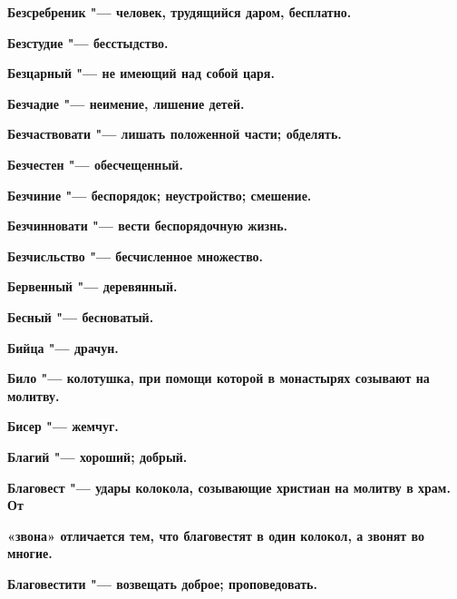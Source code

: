\begin{mymulticols}{2}
\bfseries Безсребреник\normalfont{} "--- человек, трудящийся даром, бесплатно. 




\bfseries Безстудие\normalfont{} "--- бесстыдство. 




\bfseries Безцарный\normalfont{} "--- не имеющий над собой царя. 




\bfseries Безчадие\normalfont{} "--- неимение, лишение детей. 




\bfseries Безчаствовати\normalfont{} "--- лишать положенной части; обделять. 




\bfseries Безчестен\normalfont{} "--- обесчещенный. 




\bfseries Безчиние\normalfont{} "--- беспорядок; неустройство; смешение. 




\bfseries Безчинновати\normalfont{} "--- вести беспорядочную жизнь. 




\bfseries Безчисльство\normalfont{} "--- бесчисленное множество. 




\bfseries Бервенный\normalfont{} "--- деревянный. 




\bfseries Бесный\normalfont{} "--- бесноватый. 




\bfseries Бийца\normalfont{} "--- драчун. 




\bfseries Било\normalfont{} "--- колотушка, при помощи которой в монастырях созывают на молитву. 




\bfseries Бисер\normalfont{} "--- жемчуг. 




\bfseries Благий\normalfont{} "--- хороший; добрый. 




\bfseries Благовест\normalfont{} "--- удары колокола, созывающие христиан на молитву в храм. От 




\bfseries «звона»\normalfont{} отличается тем, что благовестят в один колокол, а звонят во многие. 




\bfseries Благовестити\normalfont{} "--- возвещать доброе; проповедовать. 





\end{mymulticols}
